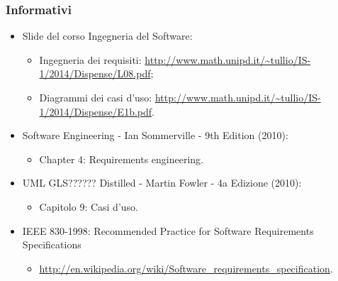 \subsubsection{Informativi}
\begin{itemize}
	\item Slide del corso Ingegneria del Software:
	\begin{itemize}
		\item Ingegneria dei requisiti: \url{http://www.math.unipd.it/~tullio/IS-1/2014/Dispense/L08.pdf};
		\item Diagrammi dei casi d'uso: \url{http://www.math.unipd.it/~tullio/IS-1/2014/Dispense/E1b.pdf}.
	\end{itemize}
	\item Software Engineering - Ian Sommerville - 9th Edition (2010):
	\begin{itemize}
		\item Chapter 4: Requirements engineering.
	\end{itemize}
	\item UML GLS?????? Distilled - Martin Fowler - 4a Edizione (2010):
	\begin{itemize}
		\item Capitolo 9: Casi d’uso.
	\end{itemize}
	\item IEEE 830-1998: Recommended Practice for Software Requirements Specifications
	\begin{itemize}
		\item \url{http://en.wikipedia.org/wiki/Software_requirements_specification}.
	\end{itemize}
\end{itemize}